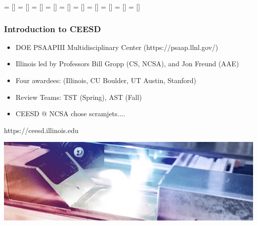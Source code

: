    = []
   = []
     = []
      = []
     = []
   = []
     = []
   = []
       = []
 = []
\newcommand{\softwaredeps}{
  \tikzstyle{every path} = [line width=0.3pt,black!70]
  \tikzstyle{every node} = [scale=1.5,IllinoisBlue, line width=1pt]
  \begin{tikzpicture}[>=latex',line join=bevel,scale=0.34,
                      transform shape]
      
  \end{tikzpicture}
}
%  
\begin{frame}\frametitle{Introduction to CEESD}
\vspace{10pt}
\begin{minipage}[t][0.3\textheight][t]{\textwidth}
\begin{multicols}{2}
\begin{itemize}
\item DOE PSAAPIII Multidisciplinary Center (https://psaap.llnl.gov/)
\item Illinois led by Professors Bill Gropp (CS, NCSA), and Jon Freund (AAE)
\columnbreak
\item Four awardees: (Illinois, CU Boulder, UT Austin, Stanford)
\item Review Teams: TST (Spring), AST (Fall)
\item CEESD @ NCSA chose scramjets....
\end{itemize}
\end{multicols}
\end{minipage}
\vspace{-10pt}
\begin{center}
https://ceesd.illinois.edu
\end{center}
\includegraphics[width=\textwidth]{Figures/mtc/ceesd_actii.png}
\end{frame}

